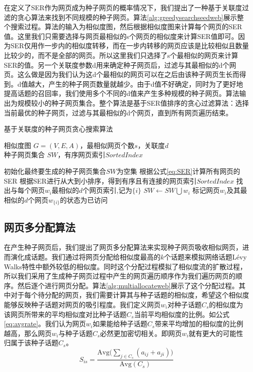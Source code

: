 在定义了SER作为网页成为种子网页的概率情况下，我们提出了一种基于关联度过滤的贪心算法来找到不同规模的种子网页。算法\ref{alg:greedysearchseedweb}展示整个搜索过程。算法的输入为相似度图，然后根据相似度图来计算每个网页的SER值。这里我们只需要选择与网页最相似的s个网页的相似度来计算SER值即可。因为SER仅用作一步内的相似度转移，而在一步内转移的网页应该是比较相似且数量比较少的，而不是全部的网页。所以这里我们只选择了s个最相似的网页来计算SER的值。另一个关联度参数d用来确定种子网页后，过滤与其最相似的d个网页。这么做是因为我们认为这d个最相似的网页可以在之后由该种子网页生长而得到。d值越大，产生的种子网页数量就越少。由于d值不好确定，同时为了更好地提高话题的召回率，我们使用多个不同的d值来产生多种规模的种子网页。算法输出为规模较小的种子网页集合。整个算法是基于SER值排序的贪心过滤算法：选择当前最优的种子网页，过滤与其最相似的d个网页，直到所有网页遍历结束。
\begin{algorithm}[!htbp]
    \caption{基于关联度的种子网页贪心搜索算法}\label{alg:greedysearchseedweb}
    \hspace*{0.02in}{\bf Input:}
    相似度图 $G=(V,E,A)$，最相似网页个数$s$，关联度$d$\\
    \hspace*{0.02in}{\bf Output:}
    种子网页集合 $SW$，有序网页索引$SortedIndex$
    \begin{algorithmic}[1]
        \State 初始化最终要生成的种子网页集合$SW$为空集
        \State 根据公式\ref{eq:SER}计算所有网页的SER
        \State 根据SER进行从大到小排序，得到有序且有连接的网页索引$SortedIndex$
        \State 找出与每个网页$w_i$最相似的$d$个网页索引,记为$\{i\}$
        \State $SW \leftarrow SW \bigcup w_i$
        \State 标记网页$w_i$及其最相似的$d$个网页$w_{\{i\}}$的状态为已访问
        \EndIf
        \EndFor
    \end{algorithmic}
\end{algorithm}


\subsection{网页多分配算法}

在产生种子网页后，我们提出了网页多分配算法来实现种子网页吸收相似网页，进而演化成话题。我们通过将网页分配给相似度最高的$k$个话题来模拟网络话题L\'evy Walks特性中额外较低的相似度。同时这个分配过程模拟了相似度流的扩散过程，所以我们采用了生成种子网页过程中产生的网页遍历顺序作为我们遍历网页的顺序。然后逐个进行网页分配。算法\ref{alg:multiallocateweb}展示了这个分配过程。其中对于每个待分配的网页，我们需要计算其与种子话题的相似度，希望这个相似度能够反映种子话题对网页的吸引程度。我们定义网页$w_i$对种子话题$C_s$的相似度为该网页所带来的平均相似度对比种子话题$C_s$当前平均相似度的比例。如公式\ref{eq:avgrate}。我们认为网页$w_i$如果能给种子话题$C_s$带来平均增加的相似度的比例越高，那么网页$w_i$与种子话题$C_s$必然更加密切相关。即网页$w_i$就有更大的可能性归属于该种子话题$C_s$。
\begin{equation}\label{eq:avgrate}
  S_{is} = \frac{\text{Avg}\big(\sum_{j\in C_s}(a_{ij}+a_{ji})\big)}{\text{Avg}(C_s)}
\end{equation}


